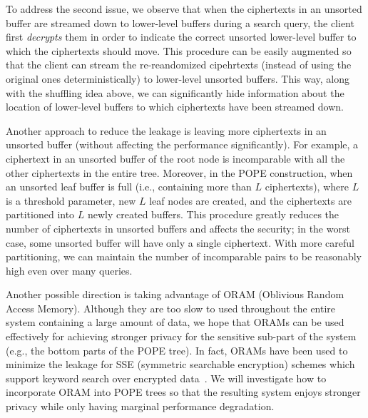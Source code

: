 To address the second issue, we observe that when the ciphertexts in an
unsorted buffer are streamed down to lower-level buffers during a search query,
the client first {\em decrypts} them in order to indicate the correct unsorted
lower-level buffer to which the ciphertexts should move. This procedure can be
easily augmented so that the client can stream the {re-reandomized cipehrtexts}
(instead of using the original ones deterministically) to lower-level unsorted
buffers. This way, along with the shuffling idea above, we can significantly
hide information about the location of lower-level buffers to which ciphertexts
have been streamed down. 




Another approach to reduce the leakage is leaving more ciphertexts in an
unsorted buffer (without affecting the performance significantly). For example,
a ciphertext in an unsorted buffer of the root node is incomparable with all
the other ciphertexts in the entire tree.  Moreover, in the POPE construction,
when an unsorted leaf buffer is full (i.e.,  containing more than $L$
ciphertexts), where $L$ is a threshold parameter, new $L$ leaf nodes are
created, and the ciphertexts are partitioned into $L$ newly created buffers.
This procedure greatly reduces the number of ciphertexts in unsorted buffers
and affects the security; in the worst case, some unsorted buffer will have
only a single ciphertext. With more careful partitioning, we can maintain the
number of incomparable pairs to be reasonably high even over many queries. 


Another possible direction is taking advantage of ORAM (Oblivious Random Access
Memory). Although they are too slow to used throughout the entire system
containing a large amount of data, we hope that ORAMs can be used effectively
for achieving stronger privacy for the sensitive sub-part of the system (e.g.,
the bottom parts of the POPE tree).  In fact, ORAMs have been used to minimize
the leakage for SSE (symmetric searchable encryption) schemes which support
keyword search over encrypted
data~\cite{NDSS:StePapShi14,C:GarMohPap16,RSA:IKLO16}. We will investigate how
to incorporate ORAM into POPE trees so that the resulting system enjoys
stronger privacy while only having marginal performance degradation.  

